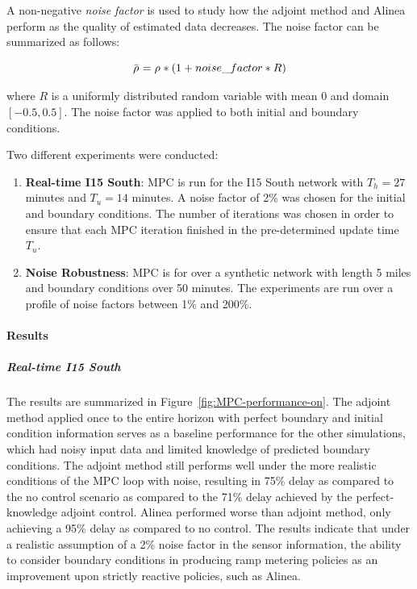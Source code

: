 								A non-negative\emph{ noise factor} is used to study how the adjoint
								method and Alinea perform as the quality of estimated data decreases.
								The noise factor can be summarized as follows:
																
								\[
									\bar{\rho_{}^{}}=\rho_{}^{}*(1+noise\_factor*R)
								\]
																
																
								where $R$ is a uniformly distributed random variable with mean $0$
								and domain $\left[-0.5,0.5\right]$. The noise factor was applied
								to both initial and boundary conditions.
																
								Two different experiments were conducted:
								\begin{enumerate}
									\item \textbf{Real-time I15 South}: MPC is run for the I15 South network
									with $T_{h}=27$ minutes and $T_{u}=14$ minutes. A noise factor of
									2\% was chosen for the initial and boundary conditions. The number
									of iterations was chosen in order to ensure that each MPC iteration
									finished in the pre-determined update time $T_{u}$.
									\item \textbf{Noise Robustness}: MPC is for over a synthetic network with
									length 5 miles and boundary conditions over 50 minutes. The experiments
									are run over a profile of noise factors between 1\% and 200\%.
								\end{enumerate}
																
								\paragraph{Results}
																
																
								\subparagraph{Real-time I15 South}
																
								The results are summarized in Figure~\ref{fig:MPC-performance-on}.
								The adjoint method applied once to the entire horizon with perfect
								boundary and initial condition information serves as a baseline performance
								for the other simulations, which had noisy input data and limited
								knowledge of predicted boundary conditions. The adjoint method still
								performs well under the more realistic conditions of the MPC loop
								with noise, resulting in 75\% delay as compared to the no control
								scenario as compared to the 71\% delay achieved by the perfect-knowledge
								adjoint control. Alinea performed worse than adjoint method, only
								achieving a 95\% delay as compared to no control. The results indicate
								that under a realistic assumption of a 2\% noise factor in the sensor
								information, the ability to consider boundary conditions in producing
								ramp metering policies as an improvement upon strictly reactive policies,
								such as Alinea.
																
